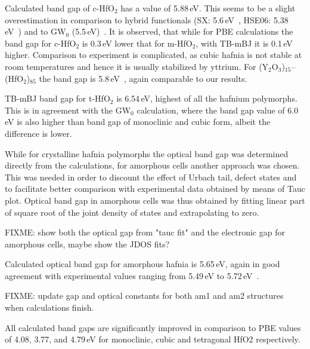 \documentclass[10pt,a4paper,twocolumn]{article}
\begin{document}
Calculated band gap of c-HfO$_2$ has a value of 5.88\,eV.
This seems to be a slight overestimation in comparison to hybrid functionals (SX: 5.6\,eV~\cite{Clark2010}, HSE06: 5.38\,eV~\cite{Yang2014}) and to GW$_0$ (5.5\,eV)~\cite{Gruning2010}.
It is observed, that while for PBE calculations the band gap for c-HfO$_2$ is 0.3\,eV lower that for m-HfO$_2$, with TB-mBJ it is 0.1\,eV higher.
Comparison to experiment is complicated, as cubic hafnia is not stable at room temperatures and hence it is usually stabilized by yttrium.
For (Y$_2$O$_3$)$_{15}$--(HfO$_2$)$_{85}$ the band gap is 5.8\,eV~\cite{Lim2002}, again comparable to our results.

TB-mBJ band gap for t-HfO$_2$ is 6.54\,eV, highest of all the hafnium polymorphs.
This is in agreement with the GW$_0$ calculation, where the band gap value of 6.0\,eV is also higher than band gap of monoclinic and cubic form, albeit the difference is lower.

While for crystalline hafnia polymorphs the optical band gap was determined directly from the calculations, for amorphous cells another approach was chosen.
This was needed in order to discount the effect of Urbach tail, defect states and to facilitate better comparison with experimental data obtained by means of Tauc plot.
Optical band gap in amorphous cells was thus obtained by fitting linear part of square root of the joint density of states and extrapolating to zero.

FIXME: show both the optical gap from "tauc fit" and the electronic gap for amorphous cells, maybe show the JDOS fits?

Calculated optical band gap for amorphous hafnia is 5.65\,eV, again in good agreement with experimental values ranging from 5.49\,eV to 5.72\,eV~\cite{Takeuchi2004, Nguyen2005, Perevalov2007}.

FIXME: update gap and optical constants for both am1 and am2 structures when calculations finish.

All calculated band gaps are significantly improved in comparison to PBE values of 4.08, 3.77, and 4.79\,eV for monoclinic, cubic and tetragonal HfO2 respectively.
\end{document}
